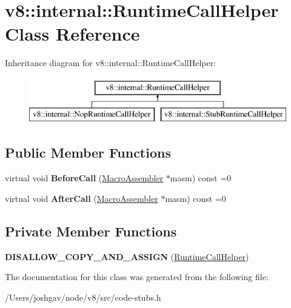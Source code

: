 \hypertarget{classv8_1_1internal_1_1_runtime_call_helper}{}\section{v8\+:\+:internal\+:\+:Runtime\+Call\+Helper Class Reference}
\label{classv8_1_1internal_1_1_runtime_call_helper}
Inheritance diagram for v8\+:\+:internal\+:\+:Runtime\+Call\+Helper\+:\begin{figure}[H]
\begin{center}
\leavevmode
\includegraphics[height=2.000000cm]{classv8_1_1internal_1_1_runtime_call_helper}
\end{center}
\end{figure}
\subsection*{Public Member Functions}
\begin{DoxyCompactItemize}
\item 
virtual void {\bfseries Before\+Call} (\hyperlink{classv8_1_1internal_1_1_macro_assembler}{Macro\+Assembler} $\ast$masm) const  =0\hypertarget{classv8_1_1internal_1_1_runtime_call_helper_a9caf725793ae155b77900b1d5703aa03}{}\label{classv8_1_1internal_1_1_runtime_call_helper_a9caf725793ae155b77900b1d5703aa03}

\item 
virtual void {\bfseries After\+Call} (\hyperlink{classv8_1_1internal_1_1_macro_assembler}{Macro\+Assembler} $\ast$masm) const  =0\hypertarget{classv8_1_1internal_1_1_runtime_call_helper_aee630dc07ac430775d661ed73d3f46cf}{}\label{classv8_1_1internal_1_1_runtime_call_helper_aee630dc07ac430775d661ed73d3f46cf}

\end{DoxyCompactItemize}
\subsection*{Private Member Functions}
\begin{DoxyCompactItemize}
\item 
{\bfseries D\+I\+S\+A\+L\+L\+O\+W\+\_\+\+C\+O\+P\+Y\+\_\+\+A\+N\+D\+\_\+\+A\+S\+S\+I\+GN} (\hyperlink{classv8_1_1internal_1_1_runtime_call_helper}{Runtime\+Call\+Helper})\hypertarget{classv8_1_1internal_1_1_runtime_call_helper_afc71ce25a9a0f2cbef7e14b9d25bebb5}{}\label{classv8_1_1internal_1_1_runtime_call_helper_afc71ce25a9a0f2cbef7e14b9d25bebb5}

\end{DoxyCompactItemize}


The documentation for this class was generated from the following file\+:\begin{DoxyCompactItemize}
\item 
/\+Users/joshgav/node/v8/src/code-\/stubs.\+h\end{DoxyCompactItemize}
